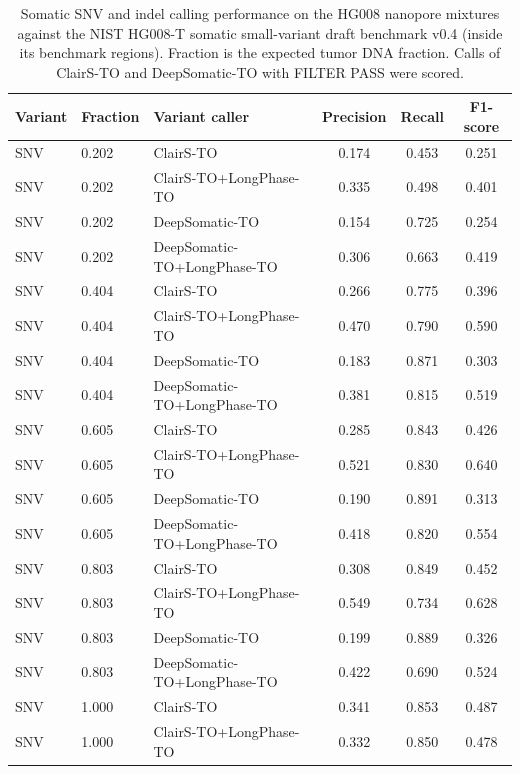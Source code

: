 \documentclass[pdflatex,sn-nature]{sn-jnl}
\begin{document}
\begin{table}[htbp]
  \centering
  \caption[Somatic SNV and indel calling on HG008]%
  {Somatic SNV and indel calling performance on the HG008 nanopore mixtures against the NIST HG008-T somatic small-variant draft benchmark v0.4 (inside its benchmark regions). Fraction is the expected tumor DNA fraction. Calls of ClairS-TO and DeepSomatic-TO with FILTER PASS were scored.}
  \label{tab:hg008-somatic}
  \small
  \begin{tabular}{@{}lllccc@{}}
    \toprule
    Variant & Fraction & Variant caller & Precision & Recall & F1-score \\
    \midrule
    SNV & 0.202 & ClairS-TO & 0.174 & 0.453 & 0.251 \\
    SNV & 0.202 & ClairS-TO+LongPhase-TO & 0.335 & 0.498 & 0.401 \\
    SNV & 0.202 & DeepSomatic-TO & 0.154 & 0.725 & 0.254 \\
    SNV & 0.202 & DeepSomatic-TO+LongPhase-TO & 0.306 & 0.663 & 0.419 \\
    \addlinespace
    SNV & 0.404 & ClairS-TO & 0.266 & 0.775 & 0.396 \\
    SNV & 0.404 & ClairS-TO+LongPhase-TO & 0.470 & 0.790 & 0.590 \\
    SNV & 0.404 & DeepSomatic-TO & 0.183 & 0.871 & 0.303 \\
    SNV & 0.404 & DeepSomatic-TO+LongPhase-TO & 0.381 & 0.815 & 0.519 \\
    \addlinespace
    SNV & 0.605 & ClairS-TO & 0.285 & 0.843 & 0.426 \\
    SNV & 0.605 & ClairS-TO+LongPhase-TO & 0.521 & 0.830 & 0.640 \\
    SNV & 0.605 & DeepSomatic-TO & 0.190 & 0.891 & 0.313 \\
    SNV & 0.605 & DeepSomatic-TO+LongPhase-TO & 0.418 & 0.820 & 0.554 \\
    \addlinespace
    SNV & 0.803 & ClairS-TO & 0.308 & 0.849 & 0.452 \\
    SNV & 0.803 & ClairS-TO+LongPhase-TO & 0.549 & 0.734 & 0.628 \\
    SNV & 0.803 & DeepSomatic-TO & 0.199 & 0.889 & 0.326 \\
    SNV & 0.803 & DeepSomatic-TO+LongPhase-TO & 0.422 & 0.690 & 0.524 \\
    \addlinespace
    SNV & 1.000 & ClairS-TO & 0.341 & 0.853 & 0.487 \\
    SNV & 1.000 & ClairS-TO+LongPhase-TO & 0.332 & 0.850 & 0.478 \\

\end{tabular}
\end{table}
\end{document}
